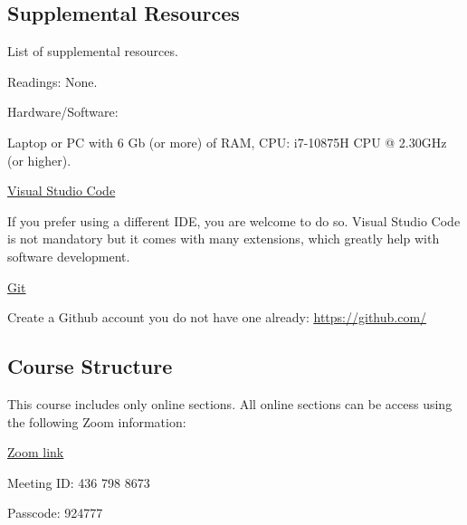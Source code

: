 \documentclass[11pt,usenames,dvipsnames,svgnames,x11names,letterpaper]{article}
\newcommand{\urllink}[2]{\href{#1}{\textcolor{Tomato3}{{{\tiny\faChevronRight}\uline{#2}}}}}
\newcommand{\mynote}{\textcolor{DodgerBlue2}{{\faEdit}}\xspace}
\begin{document}
\subsection{Supplemental Resources}
List of supplemental resources.
\begin{compactitem}
    \item Readings: None.
    \item Hardware/Software: 
    \begin{compactitem}
        \item Laptop or PC with 6 Gb (or more) of RAM, CPU: i7-10875H CPU @ 2.30GHz (or higher). 
        \item \urllink{https://code.visualstudio.com/}{Visual Studio Code}
        \begin{compactitem}
            \item \mynote If you prefer using a different IDE, you are welcome to do so. Visual Studio Code is not mandatory but it comes with many extensions, which greatly help with software development.
        \end{compactitem}
        \item \urllink{https://git-scm.com/}{Git}
        \begin{compactitem}
            \item {}
            \item {}
            \item {}
            \item Create a Github account you do not have one already:  \urllink{https://github.com/}{https://github.com/}
        \end{compactitem}
        
    \end{compactitem}
\end{compactitem} \vspace{0.3cm}

\subsection{Course Structure}
\noindent This course includes only online sections. All online sections can be access using the following Zoom information:
\begin{compactitem}
    \item \urllink{https://umd.zoom.us/j/4367988673?pwd=N0VHdkZnRGlKOUdDOXk0dGdoNmIzUT09}{Zoom link}
    \item Meeting ID: 436 798 8673
    \item Passcode: 924777
\end{compactitem}
\end{document}
